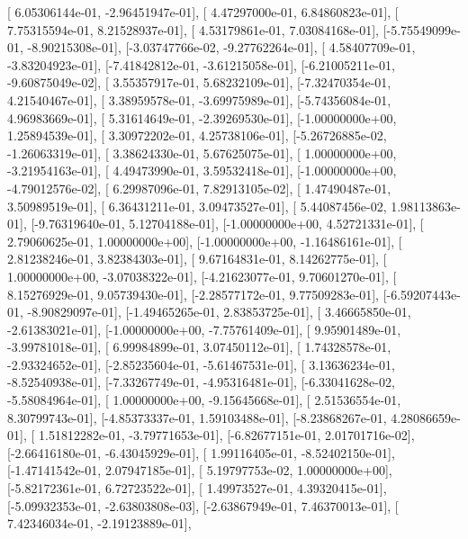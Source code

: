 \documentclass{article}
\begin{document}
       [ 6.05306144e-01, -2.96451947e-01],
       [ 4.47297000e-01,  6.84860823e-01],
       [ 7.75315594e-01,  8.21528937e-01],
       [ 4.53179861e-01,  7.03084168e-01],
       [-5.75549099e-01, -8.90215308e-01],
       [-3.03747766e-02, -9.27762264e-01],
       [ 4.58407709e-01, -3.83204923e-01],
       [-7.41842812e-01, -3.61215058e-01],
       [-6.21005211e-01, -9.60875049e-02],
       [ 3.55357917e-01,  5.68232109e-01],
       [-7.32470354e-01,  4.21540467e-01],
       [ 3.38959578e-01, -3.69975989e-01],
       [-5.74356084e-01,  4.96983669e-01],
       [ 5.31614649e-01, -2.39269530e-01],
       [-1.00000000e+00,  1.25894539e-01],
       [ 3.30972202e-01,  4.25738106e-01],
       [-5.26726885e-02, -1.26063319e-01],
       [ 3.38624330e-01,  5.67625075e-01],
       [ 1.00000000e+00, -3.21954163e-01],
       [ 4.49473990e-01,  3.59532418e-01],
       [-1.00000000e+00, -4.79012576e-02],
       [ 6.29987096e-01,  7.82913105e-02],
       [ 1.47490487e-01,  3.50989519e-01],
       [ 6.36431211e-01,  3.09473527e-01],
       [ 5.44087456e-02,  1.98113863e-01],
       [-9.76319640e-01,  5.12704188e-01],
       [-1.00000000e+00,  4.52721331e-01],
       [ 2.79060625e-01,  1.00000000e+00],
       [-1.00000000e+00, -1.16486161e-01],
       [ 2.81238246e-01,  3.82384303e-01],
       [ 9.67164831e-01,  8.14262775e-01],
       [ 1.00000000e+00, -3.07038322e-01],
       [-4.21623077e-01,  9.70601270e-01],
       [ 8.15276929e-01,  9.05739430e-01],
       [-2.28577172e-01,  9.77509283e-01],
       [-6.59207443e-01, -8.90829097e-01],
       [-1.49465265e-01,  2.83853725e-01],
       [ 3.46665850e-01, -2.61383021e-01],
       [-1.00000000e+00, -7.75761409e-01],
       [ 9.95901489e-01, -3.99781018e-01],
       [ 6.99984899e-01,  3.07450112e-01],
       [ 1.74328578e-01, -2.93324652e-01],
       [-2.85235604e-01, -5.61467531e-01],
       [ 3.13636234e-01, -8.52540938e-01],
       [-7.33267749e-01, -4.95316481e-01],
       [-6.33041628e-02, -5.58084964e-01],
       [ 1.00000000e+00, -9.15645668e-01],
       [ 2.51536554e-01,  8.30799743e-01],
       [-4.85373337e-01,  1.59103488e-01],
       [-8.23868267e-01,  4.28086659e-01],
       [ 1.51812282e-01, -3.79771653e-01],
       [-6.82677151e-01,  2.01701716e-02],
       [-2.66416180e-01, -6.43045929e-01],
       [ 1.99116405e-01, -8.52402150e-01],
       [-1.47141542e-01,  2.07947185e-01],
       [ 5.19797753e-02,  1.00000000e+00],
       [-5.82172361e-01,  6.72723522e-01],
       [ 1.49973527e-01,  4.39320415e-01],
       [-5.09932353e-01, -2.63803808e-03],
       [-2.63867949e-01,  7.46370013e-01],
       [ 7.42346034e-01, -2.19123889e-01],
\end{document}
